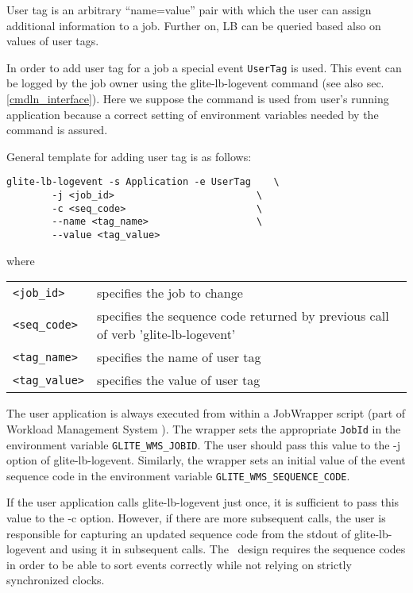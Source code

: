 

User tag is an arbitrary ``name=value'' pair with which the user can 
assign additional information to a job. Further on, LB can be queried
based also on values of user tags.

In order to add user tag for a job a special event \verb+UserTag+ is used. This
event can be logged by the job owner using the glite-lb-logevent command (see also
sec.\ref{cmdln_interface}). Here we suppose the command is used from user's running
 application because a correct setting of environment variables needed by 
the command is assured.

General template for adding user tag is as follows:

\begin{verbatim}
glite-lb-logevent -s Application -e UserTag    \
        -j <job_id>                         \
        -c <seq_code>                       \
        --name <tag_name>                   \
        --value <tag_value>
\end{verbatim}

where

\begin{tabularx}{\textwidth}{lX}
\verb'<job_id>'    & specifies the job to change \\
\verb'<seq_code>'   & specifies the sequence code returned by previous call
			of verb 'glite-lb-logevent'\\
\verb'<tag_name>'    & specifies the name of user tag\\
\verb'<tag_value>' & specifies the value of user tag\\
\end{tabularx}

The user application is always executed from within a JobWrapper script (part of Workload Management System \cite{jgc}). The wrapper  sets the  appropriate \verb'JobId' in the environment variable \verb'GLITE_WMS_JOBID'. The user should pass this value to the -j option of glite-lb-logevent.  Similarly, the wrapper sets an initial value of the event sequence code in the environment variable \verb'GLITE_WMS_SEQUENCE_CODE'.

If the user application calls glite-lb-logevent just once, it is sufficient to pass this value to the -c option.  However, if there are more  subsequent calls,  the  user is responsible for capturing an updated sequence code from the stdout of glite-lb-logevent and using it in subsequent calls.  The \LB\ design requires the sequence codes in  order  to  be able to sort events correctly while not relying on strictly synchronized clocks.  

